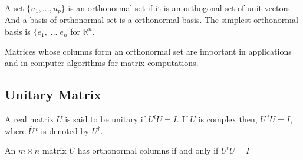 \documentclass[aima104_lecturenotes_ku.tex]{subfiles}
\begin{document}
\begin{mdframed}
  A set $\{u_1, ..., u_p\}$ is an orthonormal set if it is an orthogonal set of unit vectors. And a basis of orthonormal set is a orthonormal basis. The simplest orthonormal basis is $\{e_1, \; ...\; e_n$ for $\mathbb{R}^n$.
\end{mdframed}


Matrices whose columns form an orthonormal set are important in applications and in computer algorithms for matrix computations.

\subsection{Unitary Matrix}
A real matrix $U$ is said to be unitary if $U^tU=I$. If $U$ is complex then, $\overline{U}\, ^t U= I$, where $\overline{U}\, ^t$ is denoted by ${U}^{\dagger}$.
\begin{theorem}
  An $m \times n$ matrix $U$ has orthonormal columns if and only if $U^tU=I$
\end{theorem}
\end{document}
